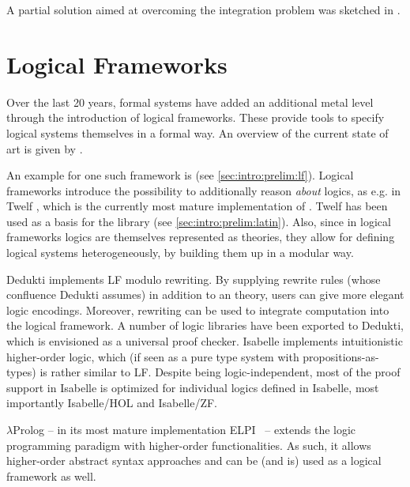 A partial solution aimed at overcoming the
integration problem was sketched in \cite{RKS:integration:11}.

\section{Logical Frameworks}\label{sec:intro:sota:lf} Over the last 20 years, formal systems have added an additional metal level through the introduction of logical frameworks. These provide tools to specify logical systems themselves in a formal way. An overview of the current state of art is given by \cite{logicalframeworks}.

An example for one such framework is \LF \cite{lf} (see \autoref{sec:intro:prelim:lf}). %
Logical frameworks introduce the possibility to additionally reason \emph{about} logics, as e.g. in Twelf \cite{twelf}, which is the currently most mature implementation of \LF. Twelf has been used as a basis for the \latin library (see \autoref{sec:intro:prelim:latin}). Also, since in logical frameworks logics are themselves represented as theories, they allow for defining logical systems heterogeneously, by building them up in a modular way.

Dedukti \cite{dedukti} implements LF modulo rewriting.
By supplying rewrite rules (whose confluence Dedukti assumes) in addition to an \LF theory, users can give more elegant logic encodings.
Moreover, rewriting can be used to integrate computation into the logical framework.
A number of logic libraries have been exported to Dedukti, which is envisioned as a universal proof checker. Isabelle \cite{isabelle} implements intuitionistic higher-order logic, which (if seen as a pure type system with propositions-as-types) is rather similar to LF.
Despite being logic-independent, most of the proof support in Isabelle is optimized for individual logics defined in Isabelle, most importantly Isabelle/HOL and Isabelle/ZF.

$\lambda$Prolog -- in its most mature implementation ELPI~\cite{elpi} -- extends the logic programming paradigm with higher-order functionalities. As such, it allows higher-order abstract syntax approaches and can be (and is) used as a logical framework as well.\medskip

